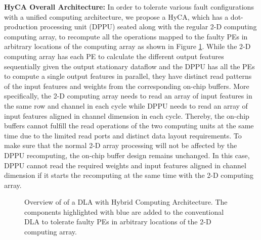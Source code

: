 \textbf{HyCA Overall Architecture:}
In order to tolerate various fault configurations with a unified computing architecture, we propose a HyCA, which has a dot-production processing unit (DPPU) seated along with the regular 2-D computing computing array, to recompute all the operations mapped to the faulty PEs in arbitrary locations of the computing array as shown in Figure \ref{fig:mapping}. While the 2-D computing array has each PE to calculate the different output features sequentially given the output stationary dataflow \cite{Chen2016Eyeriss} and the DPPU has all the PEs to compute a single output features in parallel, they have distinct read patterns of the input features and weights from the corresponding on-chip buffers. More specifically, the 2-D computing array needs to read an array of input features in the same row and channel in each cycle while DPPU needs to read an array of input features aligned in channel dimension in each cycle. Thereby, the on-chip buffers cannot fulfill the read operations of the two computing units at the same time due to the limited read ports and distinct data layout requirements. To make sure that the normal 2-D array processing will not be affected by the DPPU recomputing, the on-chip buffer design remains unchanged. In this case, DPPU cannot read the required weights and input features aligned in channel dimension if it starts the recomputing at the same time with the 2-D computing array. 

\begin{figure}
    \setlength{\abovecaptionskip}{-2pt}
    \setlength{\belowcaptionskip}{0pt}
            \caption{Overview of of a DLA with Hybrid Computing Architecture. The components highlighted with blue are added to the conventional DLA to tolerate faulty PEs in arbitrary locations of the 2-D computing array.}
            \label{fig:mapping}
            \vspace{-1.5em}
\end{figure}

